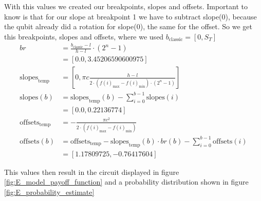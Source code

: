 \documentclass[a4paper, 12pt, one column, aas_macros]{article}
\begin{document}
With this values we created our breakpoints, slopes and offsets. Important to know is that for our slope at breakpoint 1 we have to subtract slope(0), because the qubit already did a rotation for slope(0), the same for the offset. So we get this breakpoints, slopes and offsets, where we used $b_{\text{classic}} = [0, S_T ]$
\begin{align}
    br &= \frac{b_{\text{classic}}-l}{h-l} \cdot (2^{n}-1) \nonumber \\
    &= [0.0, 3.45206590600975] \nonumber \\
    \text{slopes}_\text{temp} &= [0, \pi c\frac{h-l}{2\cdot (f(i)_\text{max}-f(i)_\text{min}) \cdot(2^{n}-1)}] \nonumber \\
    \text{slopes}(b) &= \text{slopes}_\text{temp}(b) - \sum_{i=0}^{b-1} \text{slopes}(i) \nonumber \\
     &= [0.0,         0.22136774] \nonumber \\
    \text{offsets}_\text{temp} &= - \frac{\pi c^2}{2\cdot (f(i)_\text{max}-f(i)_\text{min})} \nonumber \\
    \text{offsets}(b) &= \text{offsets}_\text{temp} - \text{slopes}_\text{temp}(b) \cdot br(b) - \sum_{i=0}^{b-1} \text{offsets}(i) \nonumber \\
    &= [ 1.17809725, -0.76417604] \nonumber
\end{align}

This values then result in the circuit displayed in figure \ref{fig:E_model_payoff_function} and a probability distribution shown in figure \ref{fig:E_probability_estimate}
 
\end{document}
